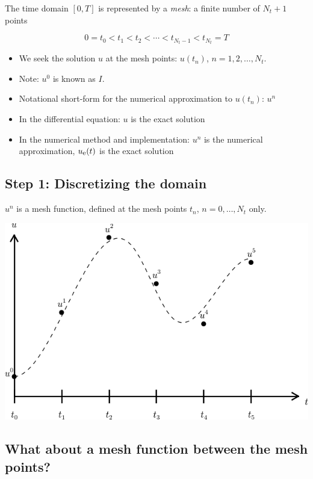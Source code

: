\documentclass[%
oneside,                 %
final,                   %
10pt]{article}
\begin{document}
 


The time domain $[0,T]$ is represented by a \emph{mesh}: a finite number of
$N_t+1$ points

\[0 = t_0 < t_1 < t_2 < \cdots < t_{N_t-1} < t_{N_t} = T\]


\begin{itemize}
 \item We seek the solution $u$ at the mesh points: $u(t_n)$, $n=1,2,\ldots,N_t$.

 \item Note: $u^0$ is known as $I$.

 \item Notational short-form for the numerical approximation to $u(t_n)$: $u^n$

 \item In the differential equation: $u$ is the exact solution

 \item In the numerical method and implementation: $u^n$ is the numerical
   approximation, $\uex(t)$ is the exact solution
\end{itemize}

\noindent
\subsection*{Step 1: Discretizing the domain}

$u^n$ is a mesh function, defined at the mesh points $t_n$, $n=0,\ldots,N_t$
only.




\centerline{\includegraphics[width=0.7\linewidth]{fig-alg/fdm_u_ue.png}}



\subsection*{What about a mesh function between the mesh points?}
\end{document}
